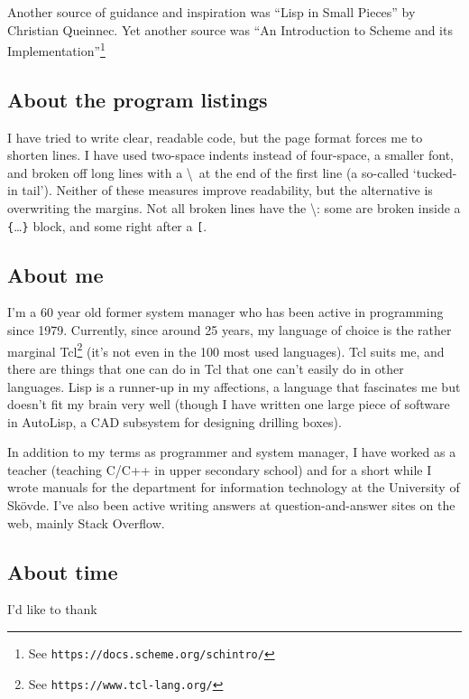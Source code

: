 \documentclass[twoside]{report}
\begin{document}
Another source of guidance and inspiration was ``Lisp in Small Pieces'' by
Christian Queinnec. Yet another source was ``An Introduction to Scheme and its
Implementation''\footnote{See \texttt{https://docs.scheme.org/schintro/}}

\subsection{About the program listings}
\label{about-the-program-listings}

I have tried to write clear, readable code, but the page format forces me to
shorten lines. I have used two-space indents instead of four-space, a smaller
font, and broken off long lines with a \textbackslash\  at the end of the first
line (a so-called `tucked-in tail'). Neither of these measures improve
readability, but the alternative is overwriting the margins. Not all broken
lines have the \textbackslash: some are broken inside a
\texttt{\{}\ldots\texttt{\}} block, and some right after a \texttt{^^5b}.

\subsection{About me}
\label{about-me}

I'm a 60 year old former system manager who has been active in programming
since 1979. Currently, since around 25 years, my language of choice is the
rather marginal Tcl\footnote{See \texttt{https://www.tcl-lang.org/}} (it's not
even in the 100 most used languages). Tcl suits me, and there are things that
one can do in Tcl that one can't easily do in other languages. Lisp is a
runner-up in my affections, a language that fascinates me but doesn't fit my
brain very well (though I have written one large piece of software in AutoLisp,
a CAD subsystem for designing drilling boxes).

In addition to my terms as programmer and system manager, I have worked as a
teacher (teaching C/C++ in upper secondary school) and for a short while I
wrote manuals for the department for information technology at
the University of Skövde. I've also been active writing answers at
question-and-answer sites on the web, mainly Stack Overflow.

\subsection{About time}
\label{about-time}

I'd like to thank
\end{document}
